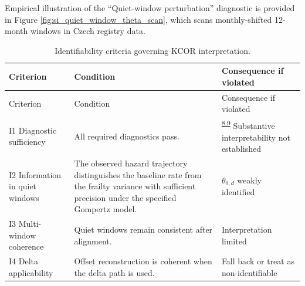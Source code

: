 \documentclass[
]{article}
\DeclareRobustCommand{\oldword}[1]{\leavevmode{\setbox0=\hbox{#1}\rlap{\raisebox{.5ex}{\rule{\wd0}{.45pt}}}\box0\relax}}
\begin{document}
Empirical illustration of the ``Quiet-window perturbation'' diagnostic is provided in Figure \ref{fig:si_quiet_window_theta_scan}, which scans monthly-shifted 12-month windows in Czech registry data.

\begin{longtable}[]{@{}
  >{\raggedright\arraybackslash}p{}
  >{\raggedright\arraybackslash}p{}
  >{\raggedright\arraybackslash}p{}@{}}
\caption{Identifiability criteria governing KCOR interpretation.}\label{tbl:si_identifiability}\tabularnewline
\toprule\noalign{}
\begin{minipage}[b]{\linewidth}\raggedright
Criterion
\end{minipage} & \begin{minipage}[b]{\linewidth}\raggedright
Condition
\end{minipage} & \begin{minipage}[b]{\linewidth}\raggedright
Consequence if violated
\end{minipage} \\
\midrule\noalign{}
\endfirsthead
\toprule\noalign{}
\begin{minipage}[b]{\linewidth}\raggedright
Criterion
\end{minipage} & \begin{minipage}[b]{\linewidth}\raggedright
Condition
\end{minipage} & \begin{minipage}[b]{\linewidth}\raggedright
Consequence if violated
\end{minipage} \\
\midrule\noalign{}
\endhead
\bottomrule\noalign{}
\endlastfoot
I1 Diagnostic sufficiency & All required diagnostics pass. & \textsuperscript{\hyperlink{issue-8.9}{8.9}} \oldword{KCOR} \oldword{interpretable} {\color{red} Substantive interpretability not established} \\
I2 Information in quiet windows & The observed hazard trajectory distinguishes the baseline rate from the frailty variance with sufficient precision under the specified Gompertz model. & \(\theta_{0,d}\) weakly identified \\
I3 Multi-window coherence & Quiet windows remain consistent after alignment. & Interpretation limited \\
I4 Delta applicability & Offset reconstruction is coherent when the delta path is used. & Fall back or treat as non-identifiable \\

\end{longtable}
\end{document}
